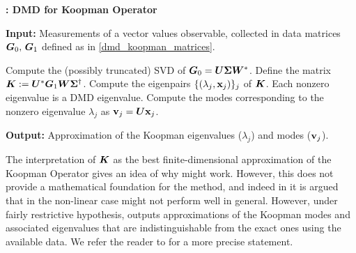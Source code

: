 \begin{algorithm}[h]
\caption{\textbf{: DMD for Koopman Operator}}
\label{alg_koopman_dmd}
\textbf{Input:} Measurements of a vector values observable, collected in data matrices $\vb*{G}_0,\,\vb*{G}_1$ defined as in \eqref{dmd_koopman_matrices}.
\begin{algorithmic}[1]
\State Compute the (possibly truncated) SVD of $\vb*{G}_0 = \vb*{U}\vb*{\Sigma}\vb*{W}^*$.
\State Define the matrix $\vb*{K} := \vb*{U}^*\vb*{G}_1\vb*{W}\vb*{\Sigma}^{\dagger}$.
\State Compute the eigenpairs $\{(\lambda_j, \vb{x}_j)\}_j$ of $\vb*{K}$. Each nonzero eigenvalue is a DMD eigenvalue.
\State Compute the modes corresponding to the nonzero eigenvalue $\lambda_j$ as $\vb{v}_j = \vb*{U}\vb{x}_j$. 
\end{algorithmic}
\textbf{Output:} Approximation of the Koopman eigenvalues ($\lambda_j$) and modes ($\vb{v}_j$).
\end{algorithm}


The interpretation of $\vb*{K}$ as the best finite-dimensional approximation of the Koopman Operator gives an idea of why  might work. However, this does not provide a mathematical foundation for the method, and indeed in \cite{tu_dynamic_2014, bagheri_koopman-mode_2013} it is argued that in the non-linear case  might not perform well in general. However, under fairly restrictive hypothesis,  outputs approximations of the Koopman modes and associated eigenvalues that are indistinguishable from the exact ones using the available data. We refer the reader to \cite{rowley_spectral_2009, tu_dynamic_2014} for a more precise statement.

